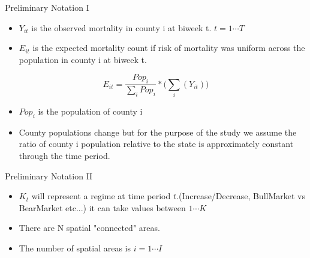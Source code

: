 \documentclass[aspectratio=169,xcolor=dvipsnames]{beamer}
\newcommand{\?}{}
\begin{document}
\begin{frame}{Preliminary Notation I}
\begin{itemize}
\item $Y_{it}$ is the observed mortality in county i at biweek t. $t=1\cdots T$
\item $E_{it}$ is the expected mortality count if risk of mortality was uniform across the population in county i at biweek t. 
\end{itemize}
\[E_{it}=\frac{Pop_{i}}{\sum_i{Pop_i}}*\big(\sum_i(Y_{it})\big)\]
\begin{itemize}
\item $Pop_i$ is the population of county i
\item County populations change but for the purpose of the study we assume the ratio of county i population relative to the state is approximately constant through the time period.
\end{itemize}
\end{frame}

\begin{frame}{Preliminary Notation II}
\begin{itemize}
\item $K_{t}$ will represent a regime at time period $t$.(Increase/Decrease, BullMarket vs BearMarket etc...) it can take values between $1 \cdots K$ 
\item There are N spatial "connected" areas. 
\item The number of spatial areas is $i=1 \cdots I$ 
\end{itemize}

\end{frame}
\end{document}

